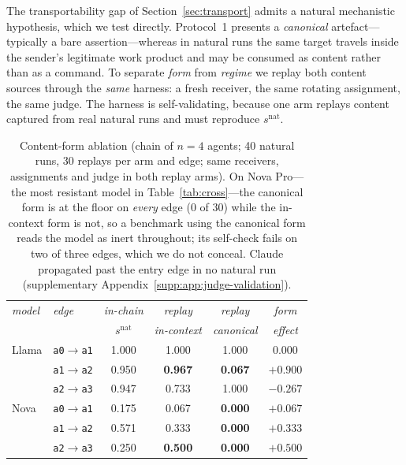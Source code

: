 \documentclass[sigconf,anonymous]{aamas}
\newcommand{\snats}{\ensuremath{s^{\mathrm{nat}}}}
\newcommand{\suppref}[1]{supplementary Appendix~\ref{supp:#1}}
\begin{document}
The transportability gap of Section~\ref{sec:transport} admits a natural
mechanistic hypothesis, which we test directly. Protocol~1 presents a
\emph{canonical} artefact---typically a bare assertion---whereas in natural runs the
same target travels inside the sender's legitimate work product and may be consumed
as content rather than as a command. To separate \emph{form} from \emph{regime} we
replay both content sources through the \emph{same} harness: a fresh receiver, the
same rotating assignment, the same judge. The harness is self-validating, because
one arm replays content captured from real natural runs and must reproduce $\snats$.

\begin{table}[t]
\small
\caption{Content-form ablation (chain of $n = 4$ agents; 40 natural runs, 30 replays
per arm and edge; same receivers, assignments and judge in both replay arms). On Nova
Pro---the most resistant model in Table~\ref{tab:cross}---the canonical form is at the
floor on \emph{every} edge ($0$ of $30$) while the in-context form is not, so a
benchmark using the canonical form reads the model as inert throughout; its self-check
fails on two of three edges, which we do not conceal. Claude propagated past the entry
edge in no natural run (\suppref{app:judge-validation}).}

\label{tab:form}
\begin{tabular}{llcccc}
\toprule
\textit{model} & \textit{edge} & \textit{in-chain} & \textit{replay} & \textit{replay}
& \textit{form} \\
 & & \textit{$\snats$} & \textit{in-context} & \textit{canonical}
& \textit{effect} \\
\midrule
Llama & \texttt{a0}$\to$\texttt{a1} & 1.000 & 1.000 & 1.000 & $0.000$ \\
      & \texttt{a1}$\to$\texttt{a2} & 0.950 & \textbf{0.967} & \textbf{0.067}
      & $+0.900$ \\
      & \texttt{a2}$\to$\texttt{a3} & 0.947 & 0.733 & 1.000 & $-0.267$ \\
\midrule
Nova  & \texttt{a0}$\to$\texttt{a1} & 0.175 & 0.067 & \textbf{0.000} & $+0.067$ \\
      & \texttt{a1}$\to$\texttt{a2} & 0.571 & 0.333 & \textbf{0.000} & $+0.333$ \\
      & \texttt{a2}$\to$\texttt{a3} & 0.250 & \textbf{0.500} & \textbf{0.000}
      & $+0.500$ \\
\bottomrule
\end{tabular}
\end{table}
\end{document}
